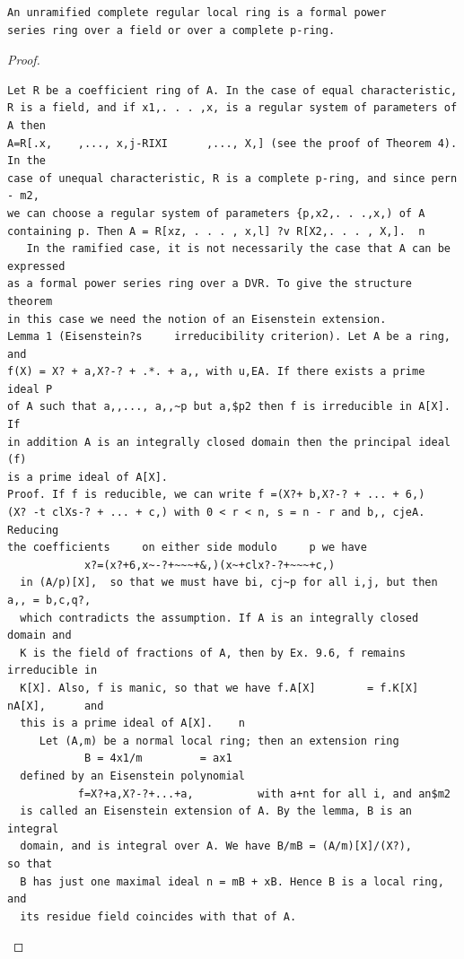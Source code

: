 \begin{theorem}\label{mcrt-auto-theorem-29-7}\uses{}
\begin{verbatim}
An unramified complete regular local ring is a formal power
series ring over a field or over a complete p-ring.
\end{verbatim}
\end{theorem}
\begin{proof}
\begin{verbatim}
Let R be a coefficient ring of A. In the case of equal characteristic,
R is a field, and if x1,. . . ,x, is a regular system of parameters of A then
A=R[.x,    ,..., x,j-RIXI      ,..., X,] (see the proof of Theorem 4). In the
case of unequal characteristic, R is a complete p-ring, and since pern - m2,
we can choose a regular system of parameters {p,x2,. . .,x,) of A
containing p. Then A = R[xz, . . . , x,l] ?v R[X2,. . . , X,].  n
   In the ramified case, it is not necessarily the case that A can be expressed
as a formal power series ring over a DVR. To give the structure theorem
in this case we need the notion of an Eisenstein extension.
Lemma 1 (Eisenstein?s     irreducibility criterion). Let A be a ring, and
f(X) = X? + a,X?-? + .*. + a,, with u,EA. If there exists a prime ideal P
of A such that a,,..., a,,~p but a,$p2 then f is irreducible in A[X]. If
in addition A is an integrally closed domain then the principal ideal (f)
is a prime ideal of A[X].
Proof. If f is reducible, we can write f =(X?+ b,X?-? + ... + 6,)
(X? -t clXs-? + ... + c,) with 0 < r < n, s = n - r and b,, cjeA. Reducing
the coefficients     on either side modulo     p we have
            x?=(x?+6,x~-?+~~~+&,)(x~+clx?-?+~~~+c,)
  in (A/p)[X],  so that we must have bi, cj~p for all i,j, but then a,, = b,c,q?,
  which contradicts the assumption. If A is an integrally closed domain and
  K is the field of fractions of A, then by Ex. 9.6, f remains irreducible in
  K[X]. Also, f is manic, so that we have f.A[X]        = f.K[X]   nA[X],      and
  this is a prime ideal of A[X].    n
     Let (A,m) be a normal local ring; then an extension ring
            B = 4x1/m         = ax1
  defined by an Eisenstein polynomial
           f=X?+a,X?-?+...+a,          with a+nt for all i, and an$m2
  is called an Eisenstein extension of A. By the lemma, B is an integral
  domain, and is integral over A. We have B/mB = (A/m)[X]/(X?),           so that
  B has just one maximal ideal n = mB + xB. Hence B is a local ring, and
  its residue field coincides with that of A.
\end{verbatim}
\end{proof}


